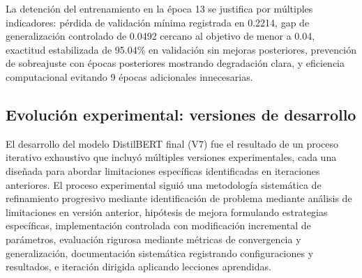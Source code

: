 La detención del entrenamiento en la época 13 se justifica por múltiples indicadores: pérdida de validación mínima registrada en 0.2214, gap de generalización controlado de 0.0492 cercano al objetivo de menor a 0.04, exactitud estabilizada de 95.04\% en validación sin mejoras posteriores, prevención de sobreajuste con épocas posteriores mostrando degradación clara, y eficiencia computacional evitando 9 épocas adicionales innecesarias.

\subsection{Evolución experimental: versiones de desarrollo}
\label{subsec:evolucion_experimental_distilbert}

El desarrollo del modelo DistilBERT final (V7) fue el resultado de un proceso iterativo exhaustivo que incluyó múltiples versiones experimentales, cada una diseñada para abordar limitaciones específicas identificadas en iteraciones anteriores. El proceso experimental siguió una metodología sistemática de refinamiento progresivo mediante identificación de problema mediante análisis de limitaciones en versión anterior, hipótesis de mejora formulando estrategias específicas, implementación controlada con modificación incremental de parámetros, evaluación rigurosa mediante métricas de convergencia y generalización, documentación sistemática registrando configuraciones y resultados, e iteración dirigida aplicando lecciones aprendidas.

